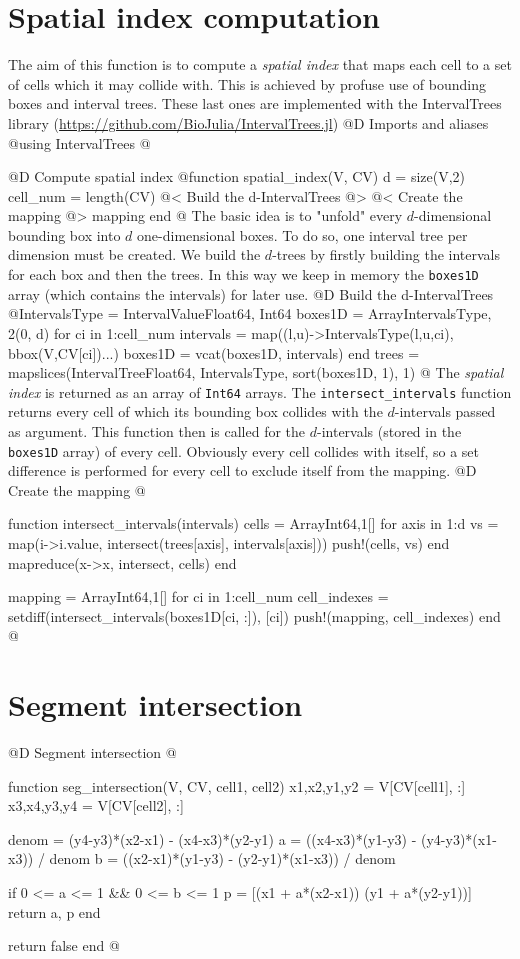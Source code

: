 \documentclass[10pt,oneside]{article}
\begin{document}
\section{Spatial index computation}
The aim of this function is to compute a \textit{spatial index} that maps
each cell to a set of cells which it may collide with.
This is achieved by profuse use of bounding boxes and interval trees. 
These last ones are implemented with the IntervalTrees library
(\url{https://github.com/BioJulia/IntervalTrees.jl})
@D Imports and aliases
@{using IntervalTrees
@}

@D Compute spatial index
@{function spatial_index(V, CV)
    d = size(V,2)
    cell_num = length(CV)
    @< Build the d-IntervalTrees @>
    @< Create the mapping @>
    mapping
end
@}
The basic idea is to "unfold" every $d$-dimensional bounding box into $d$ one-dimensional boxes.
To do so, one interval tree per dimension must be created. 
We build the $d$-trees by firstly building the intervals for each box and then the trees.
In this way we keep in memory the \texttt{boxes1D} array (which contains the intervals) for later use.
@D Build the d-IntervalTrees
@{IntervalsType = IntervalValue{Float64, Int64}
boxes1D = Array{IntervalsType, 2}(0, d)
for ci in 1:cell_num
    intervals = map((l,u)->IntervalsType(l,u,ci), bbox(V,CV[ci])...)
    boxes1D = vcat(boxes1D, intervals)
end
trees = mapslices(IntervalTree{Float64, IntervalsType}, sort(boxes1D, 1), 1)
@}
The \textit{spatial index} is returned as an array of \texttt{Int64} arrays.
The \texttt{intersect\_intervals} function returns every cell of which its bounding box collides with 
the $d$-intervals passed as argument. This function then is called for the $d$-intervals (stored in the \texttt{boxes1D} array) of every cell.
Obviously every cell collides with itself, so a set difference is performed for every cell to exclude itself from the mapping.
@D Create the mapping
@{function intersect_intervals(intervals)
    cells = Array{Int64,1}[]
    for axis in 1:d
        vs = map(i->i.value, intersect(trees[axis], intervals[axis]))
        push!(cells, vs)
    end
    mapreduce(x->x, intersect, cells)
end

mapping = Array{Int64,1}[]
for ci in 1:cell_num
    cell_indexes = setdiff(intersect_intervals(boxes1D[ci, :]), [ci])
    push!(mapping, cell_indexes)
end
@}

\section{Segment intersection}
@D Segment intersection
@{function seg_intersection(V, CV, cell1, cell2)
    x1,x2,y1,y2 = V[CV[cell1], :]
    x3,x4,y3,y4 = V[CV[cell2], :]

    denom = (y4-y3)*(x2-x1) - (x4-x3)*(y2-y1)
    a = ((x4-x3)*(y1-y3) - (y4-y3)*(x1-x3)) / denom
    b = ((x2-x1)*(y1-y3) - (y2-y1)*(x1-x3)) / denom

    if 0 <= a <= 1 && 0 <= b <= 1
        p = [(x1 + a*(x2-x1))  (y1 + a*(y2-y1))]
        return a, p
    end

    return false
end
@}
\end{document}
